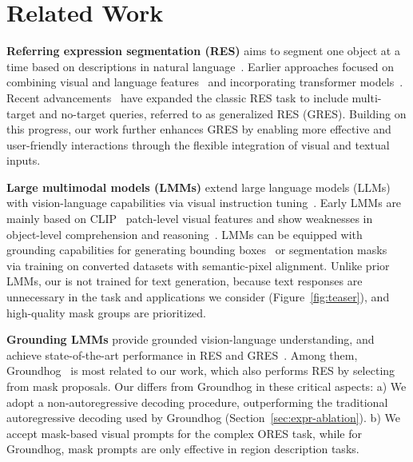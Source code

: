 \section{Related Work}
\label{sec:related}

\noindent\textbf{Referring expression segmentation (RES)} aims to segment one object at a time based on descriptions in natural language~\cite{hu2016segmentation, kazemzadeh2014referitgame, mao2016generation, yu2016modeling}. Earlier approaches focused on combining visual and language features~\cite{liu2017recurrent, li2018referring, chen2019see, ye2019cross, feng2021encoder, jing2021locate} and incorporating transformer models~\cite{wang2022cris, kim2022restr, yang2022lavt, yan2023universal}. Recent advancements~\cite{liu2023gres} have expanded the classic RES task to include multi-target and no-target queries, referred to as generalized RES (GRES). Building on this progress, our work further enhances GRES by enabling more effective and user-friendly interactions through the flexible integration of visual and textual inputs. 
 
\noindent\textbf{Large multimodal models (LMMs)} extend large language models (LLMs)~\cite{devlin2019bert, radford2018improving, touvron2023llama} with vision-language capabilities via visual instruction tuning~\cite{liu2023visual, zhu2024minigpt, dai2023instructblip}. Early LMMs are mainly based on CLIP~\cite{radford2021learning} patch-level visual features and show weaknesses in object-level comprehension and reasoning~\cite{tong2024eyes, tong2024cambrian, li2023evaluating, sun2024aligning}. LMMs can be equipped with grounding capabilities for generating bounding boxes~\cite{peng2024grounding, chen2023shikra, wang2023visionllm, pi2023detgpt, you2024ferret, li2024covlm} or segmentation masks~\cite{lai2024lisa, rasheed2024glamm, zhang2024groundhog, ren2024pixellm} via training on converted datasets with semantic-pixel alignment. Unlike prior LMMs, our \ourmodel is not trained for text generation, because text responses are unnecessary in the task and applications we consider (Figure~\ref{fig:teaser}), and high-quality mask groups are prioritized.

\noindent\textbf{Grounding LMMs} provide grounded vision-language understanding, and achieve state-of-the-art performance in RES and GRES~\cite{lai2024lisa, chng2024mask, zhang2024groundhog, rasheed2024glamm, xu2024ullava, chen2024sam4mllm, zhang2024psalm}. Among them, Groundhog~\cite{zhang2024groundhog} is most related to our work, which also performs RES by selecting from mask proposals. Our \ourmodel differs from Groundhog in these critical aspects: a) We adopt a non-autoregressive decoding procedure, outperforming the traditional autoregressive decoding used by Groundhog (Section~\ref{sec:expr-ablation}). b) We accept mask-based visual prompts for the complex ORES task, while for Groundhog, mask prompts are only effective in region description tasks.

